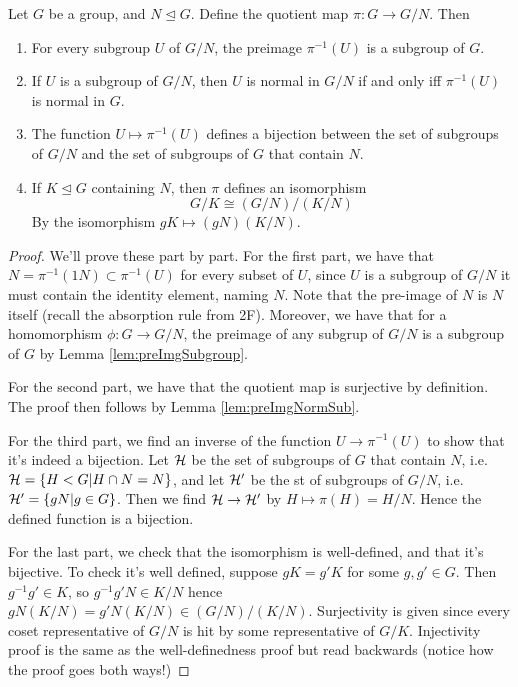 \begin{theorem} 
  Let $G$ be a group, and $N\trianglelefteq G$. Define the quotient map $\pi:G\to G/N$.
  Then
  \begin{enumerate}
    \item For every subgroup $U$ of $G/N$, the preimage $\pi^{-1}(U)$ is a subgroup of
      $G$.
    \item If $U$ is a subgroup of $G/N$, then $U$ is normal in $G/N$ if and only iff
      $\pi^{-1}(U)$ is normal in $G$.
    \item The function $U\mapsto\pi^{-1}(U)$ defines a bijection between the set of
      subgroups of $G/N$ and the set of subgroups of $G$ that contain $N$.
    \item If $K\trianglelefteq G$ containing $N$, then $\pi$ defines an isomorphism
      \[G/K \cong (G/N)/(K/N)\]
      By the isomorphism $gK\mapsto (gN)(K/N)$.
  \end{enumerate}
  \label{thm:tit}
\end{theorem}
\begin{proof}
  We'll prove these part by part. For the first part, we have that
  $N=\pi^{-1}(1N)\subset\pi^{-1}(U)$ for every subset of $U$, since $U$ is a subgroup of
  $G/N$ it must contain the identity element, naming $N$. Note that the pre-image of $N$
  is $N$ itself (recall the absorption rule from 2F). Moreover, we have that for a
  homomorphism $\phi:G\to G/N$, the preimage of any subgrup of $G/N$ is a subgroup of $G$
  by Lemma \ref{lem:preImgSubgroup}.

  For the second part, we have that the quotient map is surjective by definition. The
  proof then follows by Lemma \ref{lem:preImgNormSub}.

  For the third part, we find an inverse of the function $U\to \pi^{-1}(U)$ to show that
  it's indeed a bijection. Let $\mathcal H$ be the set of subgroups of $G$ that contain $N$, i.e.
  $\mathcal H=\{H<G | H\cap N = N\}$, and let $\mathcal H'$ be the st of subgroups of $G/N$, i.e.
  $\mathcal H'=\{gN | g\in G\}$. Then we find $\mathcal H\to\mathcal H'$ by $H\mapsto \pi (H)=H/N$. Hence the
  defined function is a bijection.

  For the last part, we check that the isomorphism is well-defined, and that it's
  bijective. To check it's well defined, suppose $gK=g'K$ for some $g,g'\in G$. Then
  $g^{-1}g'\in K$, so $g^{-1}g' N \in K/N$ hence $gN(K/N) = g'N(K/N)\in (G/N)/(K/N)$.
  Surjectivity is given since every coset representative of $G/N$ is hit by some
  representative of $G/K$. Injectivity proof is the same as the well-definedness proof but
  read backwards (notice how the proof goes both ways!)

\end{proof}

